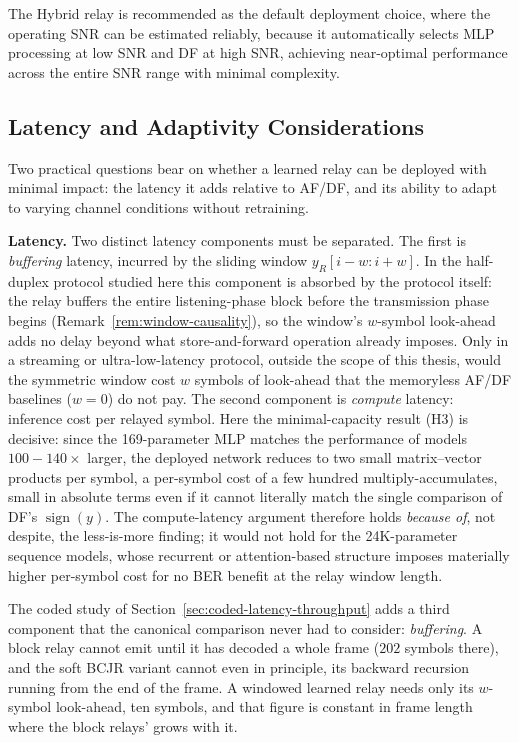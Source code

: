 The Hybrid relay is recommended as the default deployment choice, where the operating SNR can be estimated reliably, because it automatically selects MLP processing at low SNR and DF at high SNR, achieving near-optimal performance across the entire SNR range with minimal complexity.

\subsection{Latency and Adaptivity Considerations}\label{sec:latency-and-adaptivity-considerations}

Two practical questions bear on whether a learned relay can be deployed with minimal impact: the latency it adds relative to AF/DF, and its ability to adapt to varying channel conditions without retraining.

\textbf{Latency.} Two distinct latency components must be separated. The first is \emph{buffering} latency, incurred by the sliding window $y_R[i-w:i+w]$. In the half-duplex protocol studied here this component is absorbed by the protocol itself: the relay buffers the entire listening-phase block before the transmission phase begins (Remark~\ref{rem:window-causality}), so the window's $w$-symbol look-ahead adds no delay beyond what store-and-forward operation already imposes. Only in a streaming or ultra-low-latency protocol, outside the scope of this thesis, would the symmetric window cost $w$ symbols of look-ahead that the memoryless AF/DF baselines ($w=0$) do not pay. The second component is \emph{compute} latency: inference cost per relayed symbol. Here the minimal-capacity result (H3) is decisive: since the 169-parameter MLP matches the performance of models $100-140\times$ larger, the deployed network reduces to two small matrix--vector products per symbol, a per-symbol cost of a few hundred multiply-accumulates, small in absolute terms even if it cannot literally match the single comparison of DF's $\operatorname{sign}(y)$. The compute-latency argument therefore holds \emph{because of}, not despite, the less-is-more finding; it would not hold for the 24K-parameter sequence models, whose recurrent or attention-based structure imposes materially higher per-symbol cost for no BER benefit at the relay window length.

The coded study of Section~\ref{sec:coded-latency-throughput} adds a third component that the canonical comparison never had to consider: \emph{buffering}. A block relay cannot emit until it has decoded a whole frame ($202$ symbols there), and the soft BCJR variant cannot even in principle, its backward recursion running from the end of the frame. A windowed learned relay needs only its $w$-symbol look-ahead, ten symbols, and that figure is constant in frame length where the block relays' grows with it.

